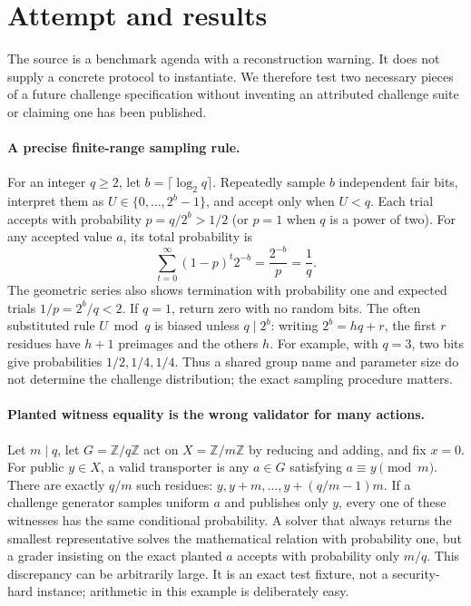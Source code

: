 \documentclass[11pt]{article}
\begin{document}
\section{Attempt and results}
The source is a benchmark agenda with a reconstruction warning. It does not
supply a concrete protocol to instantiate. We therefore test two necessary
pieces of a future challenge specification without inventing an attributed
challenge suite or claiming one has been published.

\paragraph{A precise finite-range sampling rule.}
For an integer $q\ge2$, let $b=\lceil\log_2 q\rceil$. Repeatedly sample
$b$ independent fair bits, interpret them as $U\in\{0,\ldots,2^b-1\}$,
and accept only when $U<q$. Each trial accepts with probability
$p=q/2^b>1/2$ (or $p=1$ when $q$ is a power of two). For any accepted
value $a$, its total probability is
\[
\sum_{t=0}^{\infty}(1-p)^t2^{-b}=\frac{2^{-b}}p=\frac1q.
\]
The geometric series also shows termination with probability one and expected
trials $1/p=2^b/q<2$. If $q=1$, return zero with no random bits.
The often substituted rule $U\bmod q$ is biased unless $q\mid2^b$:
writing $2^b=hq+r$, the first $r$ residues have $h+1$ preimages and the
others $h$. For example, with $q=3$, two bits give probabilities
$1/2,1/4,1/4$. Thus a shared group name and parameter size do not determine
the challenge distribution; the exact sampling procedure matters.

\paragraph{Planted witness equality is the wrong validator for many actions.}
Let $m\mid q$, let $G=\mathbb Z/q\mathbb Z$ act on
$X=\mathbb Z/m\mathbb Z$ by reducing and adding, and fix $x=0$.
For public $y\in X$, a valid transporter is any $a\in G$ satisfying
$a\equiv y\pmod m$. There are exactly $q/m$ such residues:
$y,y+m,\ldots,y+(q/m-1)m$.
If a challenge generator samples uniform $a$ and publishes only $y$, every
one of these witnesses has the same conditional probability. A solver that
always returns the smallest representative solves the mathematical relation
with probability one, but a grader insisting on the exact planted $a$ accepts
with probability only $m/q$. This discrepancy can be arbitrarily large.
It is an exact test fixture, not a security-hard instance; arithmetic in this
example is deliberately easy.
\end{document}
